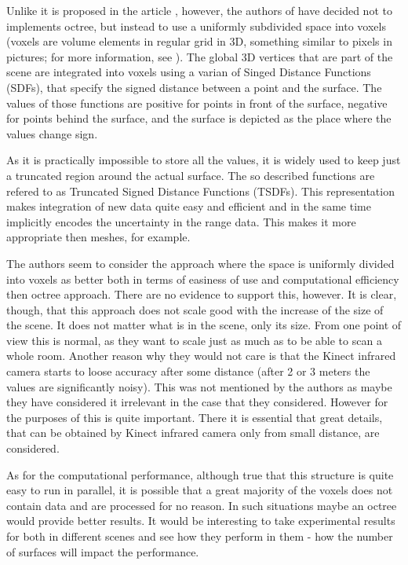 \documentclass[12pt, a4paper]{article}
\theoremstyle{plain}
\begin{document}
    Unlike it is proposed in the article
    \cite{representaion-and-rendering-of-implicit-surfaces}, however, the
    authors of \cite{kinectfusion} have decided not to implements octree, but
    instead to use a uniformly subdivided space into voxels (voxels are
    volume elements in regular grid in 3D, something similar to pixels in
    pictures; for more information, see \cite{voxel}). The global 3D vertices
    that are part of the scene are integrated into voxels using a varian of
    Singed Distance Functions (SDFs), that specify the signed distance between a
    point and the surface. The values of those functions are positive for points
    in front of the surface, negative for points behind the surface, and the
    surface is depicted as the place where the values change sign. 

    As it is practically impossible to store all the values, it is widely used
    to keep just a truncated region around the actual surface. The so described
    functions are refered to as Truncated Signed Distance Functions (TSDFs).
    This representation makes integration of new data quite easy and efficient
    and in the same time implicitly encodes the uncertainty in the range data.
    This makes it more appropriate then meshes, for example.

    The authors seem to consider the approach where the space is uniformly
    divided into voxels as better both in terms of easiness of use and
    computational efficiency then octree approach. There are no evidence to
    support this, however. It is clear, though, that this approach does not
    scale good with the increase of the size of the scene. It does not matter
    what is in the scene, only its size. From one point of view this is normal,
    as they want to scale just as much as to be able to scan a whole room.
    Another reason why they would not care is that the Kinect infrared camera
    starts to loose accuracy after some distance (after 2 or 3 meters the values
    are significantly noisy). This was not mentioned by the authors as maybe
    they have considered it irrelevant in the case that they considered. However
    for the purposes of \cite{body-scanning} this is quite important. There it
    is essential that great details, that can be obtained by Kinect infrared
    camera only from small distance, are considered.

    As for the computational performance, although true that this structure is
    quite easy to run in parallel, it is possible that a great majority of the
    voxels does not contain data and are processed for no reason. In such
    situations maybe an octree would provide better results. It would be
    interesting to take experimental results for both in different scenes and
    see how they perform in them - how the number of surfaces will impact the
    performance.
\end{document}
